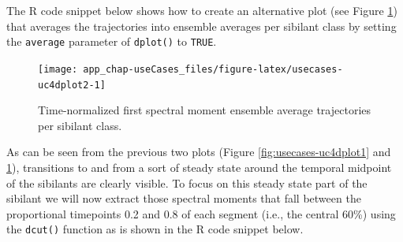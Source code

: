\documentclass[]{book}
\newenvironment{Shaded}{\begin{snugshade}}{\end{snugshade}}
\newcommand{\CommentTok}[1]{\textcolor[rgb]{0.56,0.35,0.01}{\textit{#1}}}
\newcommand{\DataTypeTok}[1]{\textcolor[rgb]{0.13,0.29,0.53}{#1}}
\newcommand{\DecValTok}[1]{\textcolor[rgb]{0.00,0.00,0.81}{#1}}
\newcommand{\FloatTok}[1]{\textcolor[rgb]{0.00,0.00,0.81}{#1}}
\newcommand{\KeywordTok}[1]{\textcolor[rgb]{0.13,0.29,0.53}{\textbf{#1}}}
\newcommand{\NormalTok}[1]{#1}
\newcommand{\OperatorTok}[1]{\textcolor[rgb]{0.81,0.36,0.00}{\textbf{#1}}}
\newcommand{\OtherTok}[1]{\textcolor[rgb]{0.56,0.35,0.01}{#1}}
\newcommand{\StringTok}[1]{\textcolor[rgb]{0.31,0.60,0.02}{#1}}
\begin{document}
The R code snippet below shows how to create an alternative plot (see Figure \ref{fig:usecases-uc4dplot2}) that averages the trajectories into ensemble averages per sibilant class by setting the \texttt{average} parameter of \texttt{dplot()} to \texttt{TRUE}.

\begin{Shaded}
\end{Shaded}

\begin{figure}

{\centering \texttt{[image: app\_chap-useCases\_files/figure-latex/usecases-uc4dplot2-1]} 

}

\caption{Time-normalized first spectral moment ensemble average trajectories per sibilant class.}\label{fig:usecases-uc4dplot2}
\end{figure}

As can be seen from the previous two plots (Figure \ref{fig:usecases-uc4dplot1} and \ref{fig:usecases-uc4dplot2}), transitions to and from a sort of steady state around the temporal midpoint of the sibilants are clearly visible. To focus on this steady state part of the sibilant we will now extract those spectral moments that fall between the proportional timepoints 0.2 and 0.8 of each segment (i.e., the central 60\%) using the \texttt{dcut()} function as is shown in the R code snippet below.

\begin{Shaded}
\end{Shaded}
\end{document}

